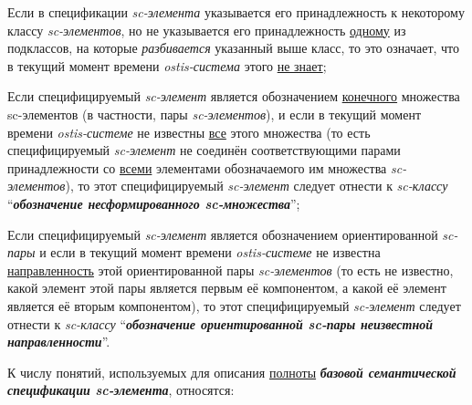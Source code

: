 \begin{textitemize}
	\item Если в спецификации \textit{sc-элемента} указывается его принадлежность к некоторому классу \textit{sc-элементов}, но не указывается его принадлежность \underline{одному} из подклассов, на которые \textit{разбивается} указанный выше класс, то это означает, что в текущий момент времени \textit{ostis-система} этого \underline{не знает};
	\item Если специфицируемый \textit{sc-элемент} является обозначением \underline{конечного} множества sc-элементов (в частности, пары \textit{sc-элементов}), и если в текущий момент времени \textit{ostis-системе} не известны \underline{все} этого множества (то есть специфицируемый \textit{sc-элемент} не соединён соответствующими парами принадлежности со \underline{всеми} элементами обозначаемого им множества \textit{sc-элементов}), то этот специфицируемый \textit{sc-элемент} следует отнести к \textit{sc-классу} ``\textbf{\textit{обозначение несформированного sc-множества}}'';
	\item Если специфицируемый \textit{sc-элемент} является обозначением ориентированной \textit{sc-пары} и если в текущий момент времени \textit{ostis-системе} не известна \underline{направленность} этой ориентированной пары \textit{sc-элементов} (то есть не известно, какой элемент этой пары является первым её компонентом, а какой её элемент является её вторым компонентом), то этот специфицируемый \textit{sc-элемент} следует отнести к \textit{sc-классу} ``\textbf{\textit{обозначение ориентированной sc-пары неизвестной направленности}}''.
\end{textitemize}

К числу понятий, используемых для описания \underline{полноты} \textbf{\textit{базовой семантической спецификации sc-элемента}}, относятся:

